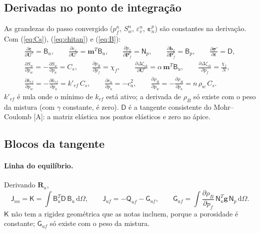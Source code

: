 \documentclass[11pt,a4paper]{article}
\newcommand{\vg}{\bm g}
\newcommand{\tsig}{\bm\sigma}
\newcommand{\teps}{\bm\varepsilon}
\newcommand{\mt}[1]{\mathsf{#1}}
\newcommand{\dd}{\mathrm d}
\begin{document}
\subsection{Derivadas no ponto de integração}
As grandezas do passo convergido ($p_f^n$, $S_w^n$, $\varepsilon_v^n$, $\teps^p_n$) são
constantes na derivação. Com (\ref{eq:Cs}), (\ref{eq:chitan}) e (\ref{eq:B}):
\begin{equation}
\begin{gathered}
\frac{\partial\teps}{\partial\mathbf U^e}=\mt B_u,\qquad
\frac{\partial\varepsilon_v}{\partial\mathbf U^e}=\bm m^T\mt B_u,\qquad
\frac{\partial p_f}{\partial\mathbf P_f^e}=\mt N_p,\qquad
\frac{\partial\bm h_f}{\partial\mathbf P_f^e}=\mt B_p,\qquad
\frac{\partial\tsig'}{\partial\teps}=\mt D,\\
\frac{\partial S_w}{\partial p_w}=-\frac{\partial S_w}{\partial p_a}=C_s,\qquad
\frac{\partial p_B}{\partial p_f}=\chi_f,\qquad
\frac{\partial\Delta\zeta_{sk}}{\partial\mathbf U^e}=\alpha\,\bm m^T\mt B_u,\qquad
\frac{\partial\Delta\zeta_{sk}}{\partial p_f}=\frac{\chi_f}{N},\\
\frac{\partial k_{rf}}{\partial p_w}=-\frac{\partial k_{rf}}{\partial p_a}=k'_{rf}\,C_s,\qquad
\frac{\partial c_a}{\partial p_a}=-c_a^2,\qquad
\frac{\partial\rho_B}{\partial p_w}=-\frac{\partial\rho_B}{\partial p_a}=n\,\rho_w\,C_s .
\end{gathered}
\label{eq:derivadas}
\end{equation}
$k'_{rf}$ é nula onde o mínimo de $k_{rf}$ está ativo; a derivada de $\rho_B$ só existe com o
peso da mistura (com $\gamma$ constante, é zero). $\mt D$ é a tangente consistente do
Mohr--Coulomb [A]: a matriz elástica nos pontos elásticos e zero no ápice.

\subsection{Blocos da tangente}
\label{sec:blocos}
\paragraph{Linha do equilíbrio.} Derivando $\mathbf R_u$,
\begin{equation}
\mt J_{uu}=\mt K=\int\mt B_u^T\mt D\,\mt B_u\,\dd\Omega,\qquad
\mt J_{uf}=-\mt Q_{uf}-\mt G_{uf},\qquad
\mt G_{uf}=\int\frac{\partial\rho_B}{\partial p_f}\,\mt N_u^T\vg\,\mt N_p\,\dd\Omega .
\label{eq:Ju}
\end{equation}
$\mt K$ não tem a rigidez geométrica que as notas incluem, porque a porosidade é constante;
$\mt G_{uf}$ só existe com o peso da mistura.
\end{document}
